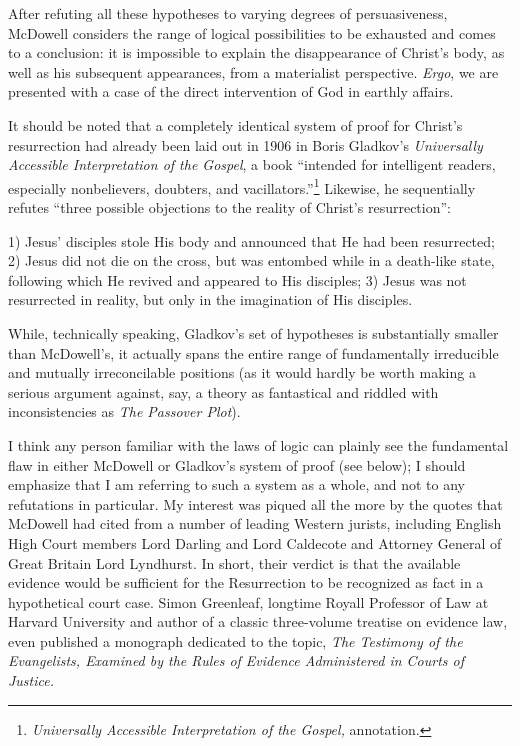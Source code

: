 After refuting all these hypotheses to varying degrees of persuasiveness, McDowell considers the range of logical possibilities to be exhausted and comes to a conclusion: it is impossible to explain the disappearance of Christ's body, as well as his subsequent appearances, from a materialist perspective. \emph{Ergo}, we are presented with a case of the direct intervention of God in earthly affairs.

It should be noted that a completely identical system of proof for Christ's resurrection had already been laid out in 1906 in Boris Gladkov's \emph{Universally Accessible Interpretation of the Gospel}, a book ``intended for intelligent readers, especially nonbelievers, doubters, and vacillators.''\footnote{\emph{Universally Accessible Interpretation of the Gospel,} annotation.} Likewise, he sequentially refutes ``three possible objections to the reality of Christ's resurrection'':

\begin{smallquote}
    1) Jesus' disciples stole His body and announced that He had been resurrected; 2) Jesus did not die on the cross, but was entombed while in a death-like state, following which He revived and appeared to His disciples; 3) Jesus was not resurrected in reality, but only in the imagination of His disciples.
\end{smallquote}
While, technically speaking, Gladkov's set of hypotheses is substantially smaller than McDowell's, it actually spans the entire range of fundamentally irreducible and mutually irreconcilable positions (as it would hardly be worth making a serious argument against, say, a theory as fantastical and riddled with inconsistencies as \emph{The Passover Plot}).

I think any person familiar with the laws of logic can plainly see the fundamental flaw in either McDowell or Gladkov's system of proof (see below); I should emphasize that I am referring to such a system as a whole, and not to any refutations in particular. My interest was piqued all the more by the quotes that McDowell had cited from a number of leading Western jurists, including English High Court members Lord Darling and Lord Caldecote and Attorney General of Great Britain Lord Lyndhurst. In short, their verdict is that the available evidence would be sufficient for the Resurrection to be recognized as fact in a hypothetical court case. Simon Greenleaf, longtime Royall Professor of Law at Harvard University and author of a classic three-volume treatise on evidence law, even published a monograph dedicated to the topic, \emph{The Testimony of the Evangelists, Examined by the Rules of Evidence Administered in Courts of Justice.}

